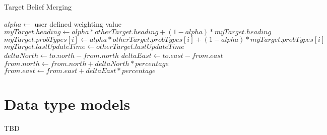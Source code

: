 \begin{algorithm}
	\caption{Target Belief Merging}
	\label{alg:mergeTarget}
	\begin{algorithmic}[1]
		\State $alpha\gets $ user defined weighting value
			\State $myTarget.heading\gets alpha * otherTarget.heading + (1-alpha)*myTarget.heading$
			\State {}
				\State $myTarget.probTypes[i]\gets alpha * otherTarget.probTypes[i] + (1-alpha)*myTarget.probTypes[i]$
			\EndFor
			\State $myTarget.lastUpdateTime\gets otherTarget.lastUpdateTime$
		\EndIf
		\EndFunction
		\\
			\State $deltaNorth\gets to.north - from.north$
			\State $deltaEast\gets to.east - from.east$
			\State $from.north\gets from.north + deltaNorth * percentage$
			\State $from.east\gets from.east + deltaEast * percentage$
		\EndFunction
	\end{algorithmic}
\end{algorithm}


\section{Data type models}
TBD

